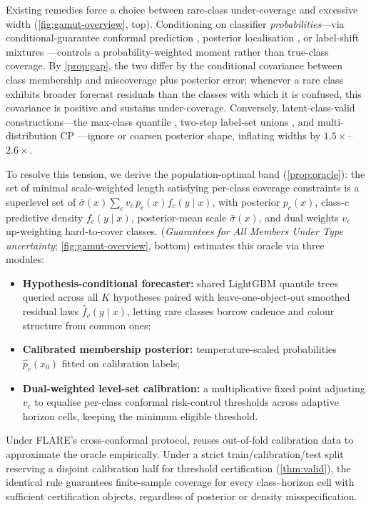Existing remedies force a choice between rare-class under-coverage and excessive width (\cref{fig:gamut-overview}, top).
Conditioning on classifier \emph{probabilities}---via conditional-guarantee conformal prediction \citep{gibbs2025conformal}, posterior localisation \citep{guan2023localized}, or label-shift mixtures \citep{podkopaev2021distribution}---controls a probability-weighted moment rather than true-class coverage.
By \cref{prop:gap}, the two differ by the conditional covariance between class membership and miscoverage plus posterior error; whenever a rare class exhibits broader forecast residuals than the classes with which it is confused, this covariance is positive and sustains under-coverage.
Conversely, latent-class-valid constructions---the max-class quantile \citep{barber2021limits}, two-step label-set unions \citep{timans2024adaptive}, and multi-distribution CP \citep[MDCP;][]{yang2026multi}---ignore or coarsen posterior shape, inflating widths by $1.5\times$--$2.6\times$.

To resolve this tension, we derive the population-optimal band (\cref{prop:oracle}): the set of minimal scale-weighted length satisfying per-class coverage constraints is a superlevel set of $\bar\sigma(x)\sum_c v_c\,p_c(x)f_c(y\mid x)$, with posterior $p_c(x)$, class-$c$ predictive density $f_c(y\mid x)$, posterior-mean scale $\bar\sigma(x)$, and dual weights $v_c$ up-weighting hard-to-cover classes.
\gamut{} (\emph{Guarantees for All Members Under Type uncertainty}; \cref{fig:gamut-overview}, bottom) estimates this oracle via three modules:
\begin{itemize}\setlength{\itemsep}{1pt}\setlength{\parskip}{0pt}\setlength{\topsep}{2pt}
\item[\textbf{C1}] \textbf{Hypothesis-conditional forecaster:} shared LightGBM quantile trees queried across all $K$ hypotheses paired with leave-one-object-out smoothed residual laws $\hat f_c(y\mid x)$, letting rare classes borrow cadence and colour structure from common ones;
\item[\textbf{C2}] \textbf{Calibrated membership posterior:} temperature-scaled probabilities $\hat p_c(x_0)$ fitted on calibration labels;
\item[\textbf{C3}] \textbf{Dual-weighted level-set calibration:} a multiplicative fixed point adjusting $v_c$ to equalise per-class conformal risk-control thresholds across adaptive horizon cells, keeping the minimum eligible threshold.
\end{itemize}
Under FLARE's cross-conformal protocol, \gamut{} reuses out-of-fold calibration data to approximate the oracle empirically.
Under a strict train/calibration/test split reserving a disjoint calibration half for threshold certification (\cref{thm:valid}), the identical rule guarantees finite-sample coverage for every class--horizon cell with sufficient certification objects, regardless of posterior or density misspecification.

